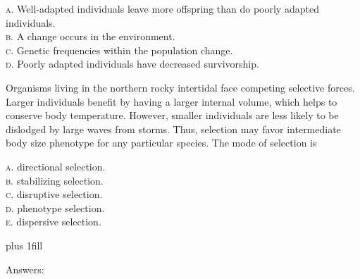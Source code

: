 \documentclass[letterpaper]{tufte-handout}
\begin{document}
\smallskip

\noindent \textsc{a}. Well-adapted individuals leave more offspring than do poorly adapted individuals.\\
\noindent \textsc{b}. A change occurs in the environment.\\
\noindent \textsc{c}. Genetic frequencies within the population change.\\
\noindent \textsc{d}. Poorly adapted individuals have decreased survivorship.\\

\bigskip

\noindent Organisms living in the northern rocky intertidal face competing selective forces. Larger individuals benefit by having a larger internal volume, which helps to conserve body temperature. However, smaller individuals are less likely to be dislodged by large waves from storms. Thus, selection may favor intermediate body size phenotype for any particular species. The mode of selection is

\smallskip

\textsc{a}. directional selection.\\
\textsc{b}. stabilizing selection. \\
\textsc{c}. disruptive selection. \\
\textsc{d}. phenotype selection. \\
\textsc{e}. dispersive selection.

%
%

\vskip0pt plus 1fill

\hfill Answers: 
\end{document}
